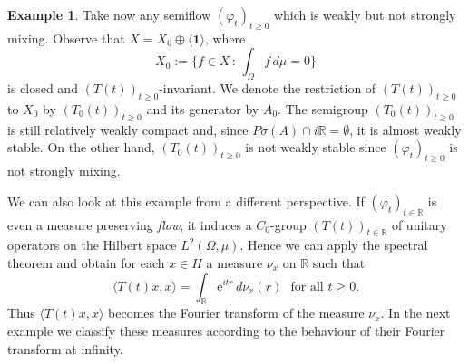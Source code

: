 \documentclass[11pt,intlimits, draft,oneside]{amsart}
\theoremstyle{definition}
\newtheorem{example}[thm]{Example}
\newcommand\Eins{\mathbf{1}}
\def\dd{\,d}
\def\Psigma{P\sigma}
\def\ee{\mathrm{e}}
\def\RR{\mathbb{R}}
\begin{document}
\begin{example}
Take now any semiflow $(\varphi_t)_{t\geq 0}$ which is weakly but
not strongly mixing. Observe that $X=X_0\oplus \langle \Eins
\rangle$, where
%
\begin{equation*}
X_0:= \biggl\{ f \in X \,:\, \int_{\Omega} f \dd\mu = 0 \biggr\}
\end{equation*}
is closed and $(T(t))_{t\geq 0}$-invariant.
%
We denote the restriction of $(T(t))_{t \geq 0}$ to $X_0$ by
$(T_0(t))_{t\geq 0}$ and its generator  by $A_0$. The semigroup
$(T_0(t))_{t\geq 0}$ is still relatively weakly compact and, since
$\Psigma (A)\cap i \RR =\emptyset$, it is almost weakly stable. On
the other hand, $(T_0(t))_{t\geq 0}$ is not weakly stable since
$(\varphi_t)_{t\geq 0}$ is not strongly mixing.

\hspace{0.1cm}

We can also look at this example from a different perspective. If
$(\varphi_t)_{t \in \RR}$ is even a measure preserving \emph{flow}, it
induces a $C_0$-group $(T(t))_{t \in \RR}$ of unitary operators on
the Hilbert space $L^2(\Omega,\mu)$. Hence we can apply the spectral
theorem and obtain for each $x\in H$ a measure $\nu_x$ on $\RR$ such
that
%
\begin{equation*}
\langle T(t)x,x \rangle = \int_{\RR} \ee^{i tr} \dd \nu_x(r) \ \ \
\text{for all } t\geq 0.
\end{equation*}
%
Thus $\langle T(t)x,x \rangle$ becomes the Fourier transform of the
measure $\nu_x$. In the next example we classify these measures
according to the behaviour of their Fourier transform at infinity.
\end{example}
\end{document}
